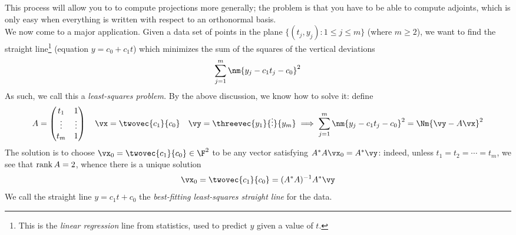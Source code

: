 This process will allow you to to compute projections more generally; the problem is that you have to be able to compute adjoints, which is only easy when everything is written with respect to an orthonormal basis.\\

We now come to a major application. Given a data set of points in the plane $\{(t_j,y_j):1\le j\le m\}$ (where $m\ge 2$), we want to find the straight line\footnote{This is the \emph{linear regression} line from statistics, used to predict $y$ given a value of $t$.} (equation $y=c_0+c_1t$) which minimizes the sum of the squares of the vertical deviations
\[\sum_{j=1}^m\nm{y_j-c_1t_j-c_0}^2\]
As such, we call this a \emph{least-squares problem.} By the above discussion, we know how to solve it: define
\[A=\begin{pmatrix}
t_1&1\\
\vdots&\vdots\\
t_m&1
\end{pmatrix}\quad \vx=\twovec{c_1}{c_0}\quad \vy=\threevec{y_1}{\vdots}{y_m} \implies \sum_{j=1}^m\nm{y_j-c_1t_j-c_0}^2 =\Nm{\vy-A\vx}^2\]
The solution is to choose $\vx_0=\twovec{c_1}{c_0}\in\F^2$ to be any vector satisfying $A^*A\vx_0=A^*\vy$: indeed, unless $t_1=t_2=\cdots =t_m$, we see that $\operatorname{rank} A=2$, whence there is a unique solution
\[\vx_0=\twovec{c_1}{c_0}=(A^*A)^{-1}A^*\vy\]
We call the straight line $y=c_1t+c_0$ the \emph{best-fitting least-squares straight line} for the data.

